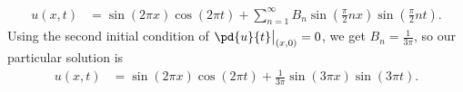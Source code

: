 \documentclass[10pt]{mypackage}
\begin{document}
\begin{solution}
\begin{enumerate}[(i)]
      \begin{align*}
        u\left( x,t \right) &= \sin\left( 2\pi x \right)\cos\left( 2\pi t \right) + \sum_{n=1}^{\infty}B_n\sin\left( \frac{\pi}{2}nx \right)\sin\left( \frac{\pi}{2}nt \right).
      \end{align*}
      Using the second initial condition of $ \pd{u}{t}\bigr\vert_{(x,0)} = 0 $, we get $B_n = \frac{1}{3\pi}$, so our particular solution is
      \begin{align*}
        u\left( x,t \right) &= \sin\left( 2\pi x \right)\cos\left( 2\pi t \right) + \frac{1}{3\pi}\sin\left( 3\pi x \right)\sin\left( 3\pi t \right).
      \end{align*}
      
  \end{enumerate}
\end{solution}
\end{document}
